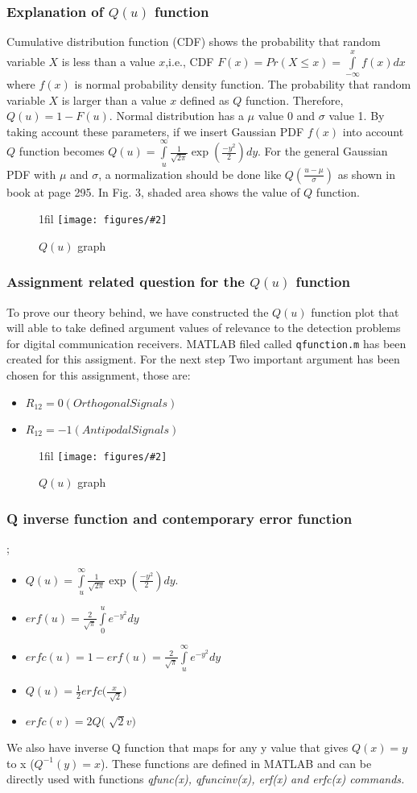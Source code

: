 \documentclass{beamer}
\makeatletter
\newcommand{\code}[1]{\texttt{#1}}
\newcommand*{\centerfloat}{%
  \parindent \z@
  \leftskip \z@ \@plus 1fil \@minus \textwidth
  \rightskip\leftskip
  \parfillskip \z@skip}
\newcommand{\fig}[3]{
  \begin{figure}[H]
  \centerfloat
    \texttt{[image: figures/\#2]}
    \caption{#3}
  \end{figure}
}
\makeatother
\begin{document}
\begin{frame}
	\frametitle{Explanation of $Q(u)$ function}
Cumulative distribution function (CDF) shows the probability that random variable $X$ is less than a value $x$,i.e., CDF $F(x)=Pr(X\leq x)=\int\limits^x_{-\infty}f(x)dx$ where $f(x)$ is normal probability density function. The probability that random variable $X$ is larger than a value $x$ defined as $Q$ function. Therefore, $Q(u)=1-F(u)$. Normal distribution has a $\mu$ value 0 and $\sigma$ value 1. By taking account these parameters, if we insert Gaussian PDF $f(x)$ into account $Q$ function becomes $Q(u)=\int\limits^{\infty}_u \frac{1}{ \sqrt{2\pi}} \exp({\frac{-y^2}{2}})dy$. For the general Gaussian PDF with $\mu$ and $\sigma$, a normalization should be done like $Q(\frac{u-\mu}{\sigma})$ as shown in book at page 295. In Fig. 3, shaded area shows the value of $Q$ function.
\end{frame}

\begin{frame}
\fig{5cm}{fig3.png}{$Q(u)$ graph }
\end{frame}



\begin{frame}
	\frametitle{Assignment related question for the $Q(u)$ function}
To prove our theory behind, we have constructed the $Q(u)$ function plot that will able to take defined argument
values of relevance to the detection problems for digital communication receivers. MATLAB filed called \code{qfunction.m} has been created for this assigment. For the next step
Two important argument has been chosen for this assignment, those are:
	\begin{itemize}
		\item $R_{12}= 0 (Orthogonal Signals)$
		\item $R_{12}= -1( Antipodal Signals) $
	\end{itemize}
\end{frame}

\begin{frame}
\fig{5cm}{figure_for_23.png}{$Q(u)$ graph }
\end{frame}

\begin{frame}
	\frametitle{Q inverse function and contemporary error function};
\begin{itemize}
	\item $Q(u)=\int\limits^{\infty}_u \frac{1}{ \sqrt{2\pi}} \exp({\frac{-y^2}{2}})dy$.
	\item $erf(u)=\frac{2}{\sqrt{\pi}} \int\limits_0^u e^{-y^2} dy$
	\item $erfc(u)=1-erf(u)=\frac{2}{\sqrt{\pi}} \int\limits_u^\infty e^{-y^2} dy$
	\item $Q(u)=\frac{1}{2} erfc\bigg( \frac{x}{\sqrt[]{2}} \bigg)$
	\item $erfc(v)=2Q \big( \sqrt[]{2} v \big)$
\end{itemize}
We also have inverse Q function that maps for any y value that gives $Q(x)=y$ to x ($Q^{-1}(y)=x$).
These functions are defined in MATLAB and can be directly used with functions \it{qfunc(x)}, \it{qfuncinv(x)}, \it{erf(x)} and \it{erfc(x)} commands.
\end{frame}
\end{document}
